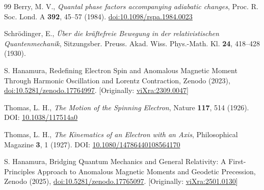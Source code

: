 \documentclass[%
 reprint,
 amsmath,amssymb,
 aps,
]{revtex4-1}
\numberwithin{equation}{section}%
\begin{document}
\begin{thebibliography}{99}
 Berry, M. V.,
\textit{Quantal phase factors accompanying adiabatic changes},
Proc. R. Soc. Lond. A \textbf{392}, 45--57 (1984).
\href{https://doi.org/10.1098/rspa.1984.0023}{doi:10.1098/rspa.1984.0023}

 Schrödinger, E.,
\textit{Über die kräftefreie Bewegung in der relativistischen Quantenmechanik},
Sitzungsber. Preuss. Akad. Wiss. Phys.-Math. Kl. \textbf{24}, 418--428 (1930).

S. Hanamura, Redefining Electron Spin and Anomalous Magnetic Moment Through Harmonic Oscillation and Lorentz Contraction, Zenodo (2023), \href{https://doi.org/10.5281/zenodo.17764997}{doi:10.5281/zenodo.17764997}. [Originally: \href{https://vixra.org/abs/2309.0047}{viXra:2309.0047}]

 Thomas, L. H., 
\textit{The Motion of the Spinning Electron}, 
Nature \textbf{117}, 514 (1926). DOI: \href{https://doi.org/10.1038/117514a0}{10.1038/117514a0}

 Thomas, L. H., 
\textit{The Kinematics of an Electron with an Axis}, 
Philosophical Magazine \textbf{3}, 1 (1927). DOI: \href{https://doi.org/10.1080/14786440108564170}{10.1080/14786440108564170}

S. Hanamura, Bridging Quantum Mechanics and General Relativity: A First-Principles Approach to Anomalous Magnetic Moments and Geodetic Precession, Zenodo (2025), \href{https://doi.org/10.5281/zenodo.17765097}{doi:10.5281/zenodo.17765097}. [Originally: \href{https://vixra.org/abs/2501.0130}{viXra:2501.0130}]

\end{thebibliography}




\end{document}

